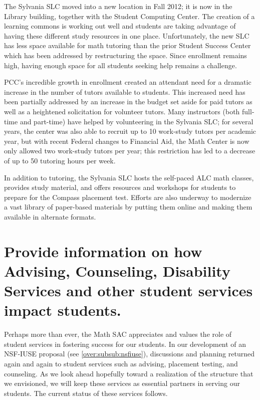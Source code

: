 The Sylvania SLC moved into a new location in Fall 2012; it is now in the Library building, together with the Student Computing Center.
The creation of a learning commons is working out well and students are taking advantage of having these different study resources in one place.
Unfortunately, the new SLC has less space available for math tutoring than the prior Student Success Center which has been addressed by restructuring the space.
Since enrollment remains high, having enough space for all students seeking help remains a challenge.

PCC's incredible growth in enrollment created an attendant need for a dramatic increase in the number of tutors available to students.
This increased need has been partially addressed by an increase in the budget set aside for paid tutors as well as a heightened solicitation for volunteer tutors.
Many instructors (both full-time and part-time) have helped by volunteering in the Sylvania SLC; for several years, the center was also able to recruit up to 10 work-study tutors per academic year, but with recent Federal changes to Financial Aid, the Math Center is now only allowed two work-study tutors per year; this restriction has led to a decrease of up to 50 tutoring hours per week.

In addition to tutoring, the Sylvania SLC hosts the self-paced ALC math classes, provides study material, and offers resources and workshops for students to prepare for the Compass placement test.
Efforts are also underway to modernize a vast library of paper-based materials by putting them online and making them available in alternate formats.

\section[Student services]{Provide information on how Advising, Counseling,
  Disability Services and other student services impact students. }

Perhaps more than ever, the Math SAC appreciates and values the role of student services in fostering success for our students.
In our development of an NSF-IUSE proposal (see \vref{over:subsub:nsfiuse}), discussions and planning returned again and again to student services such as advising, placement testing, and counseling.
As we look ahead hopefully toward a realization of the structure that we envisioned, we will keep these services as essential partners in serving our students.
The current status of these services follows.

